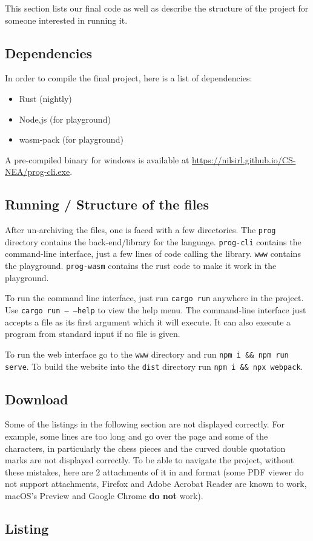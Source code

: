 \documentclass{article}
\begin{document}
This section lists our final code as well as describe the structure of the
project for someone interested in running it.

\subsection{Dependencies}

In order to compile the final project, here is a list of dependencies:

\begin{itemize}
	\item Rust (nightly)
	\item Node.js (for playground)
	\item wasm-pack (for playground)
\end{itemize}

A pre-compiled binary for windows is available at
\url{https://nilsirl.github.io/CS-NEA/prog-cli.exe}.

\subsection{Running / Structure of the files}

After un-archiving the files, one is faced with a few directories. The
\texttt{prog} directory contains the back-end/library for the language.
\texttt{prog-cli} contains the command-line interface, just a few lines of code
calling the library. \texttt{www} contains the playground. \texttt{prog-wasm}
contains the rust code to make it work in the playground.

To run the command line interface, just run \texttt{cargo run} anywhere in the
project. Use \texttt{cargo run -- --help} to view the help menu. The
command-line interface just accepts a file as its first argument which it will
execute. It can also execute a program from standard input if no file is given.

To run the web interface go to the \texttt{www} directory and run \texttt{npm i
\&\& npm run serve}. To build the website into the \texttt{dist} directory run
\texttt{npm i \&\& npx webpack}.

\subsection{Download}

Some of the listings in the following section are not displayed correctly. For
example, some lines are too long and go over the page and some of the
characters, in particularly the chess pieces and the curved double quotation
marks are not displayed correctly. To be able to navigate the project, without
these mistakes, here are 2 attachments of it in
 and
 format (some PDF viewer do not
support attachments, Firefox and Adobe Acrobat Reader are known to work,
macOS's Preview and Google Chrome \textbf{do not} work).

\subsection{Listing}



\printbibliography[heading=bibintoc]
\end{document}

